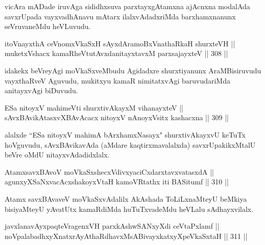 \begin{artha}
vicAra mADade iruvAga sididhxsuva parxtayxgAtamxna ajAcnxna
modalAda savxrUpada vayxvadhAnavu mAtarx ilalxvAdadxriMda
barxhamxnanunx seVruvaneMdu heVLuvudu.
\end{artha}


\begin{shl}
itoV\s nayxthA ceVnomxVkaSxH sAyxdAramoBxV\s nathaRkaH shurxteVH || \\
muketxVshacx kamaRheVtutAvxdanitayxtavxM parxsajayxteV ||  308 || 
\end{shl}

\begin{artha}
idakekx beVreyAgi moVkaSxveMbudu Agidadxre shurxtiyanunx
AraMBisiruvudu vayxthaRveV Aguvudu, mukitxyu kamaR nimitatxvAgi
baruvudariMda anitayxvAgi biDuvudu.
\end{artha}

\begin{shl}
ESa nitoyxV mahimeVti shurxtivAkayxM vihanayxteV || \\
sAvxBAvikAtasxvXBAvAcacx nitoyxV nAnoyxV\s sitx kashacxna ||  309 ||  
\end{shl}

\begin{artha}
alalxde ``ESa nitoyxV mahimA bArxhamxNasayx" shurxtivAkayxvU keTuTx
hoVguvudu, sAvxBAvikavAda (aMdare kaqtirxmavalalxda) savxrUpakikxMtalU
beVre oMdU nitayxvAdadidxlalx.
\end{artha}


\begin{shl}
AtamxsavxBAvoV moVkaSxshecxVdivxyaciCxdarxtavxvatasxdA || \\
agunxyXSaNxvacAcxshakoyxV\s taH kamoVRtathx iti BASitumf ||  310 ||  
\end{shl}

\begin{artha}
Atamx savxBAvaveV moVkaSxvAdalilx AkAshada ToLiLxnaMteyU beMkiya
bisiyaMteyU yAvatUtx kamaRdiMda huTuTxvadeMdu heVLalu sAdhayxvilalx.
\end{artha}


\begin{shl}
\footnotemark[1]javxlanavAyxpaqteVragenxVH parxkAshwSANxyXdi ceVtaPxlamf || \\
noVpalabadhxyXnatxrAyAthaRdhavxMsABivayxkatxyXpeVkaSxtaH ||  311 ||  
\end{shl}

